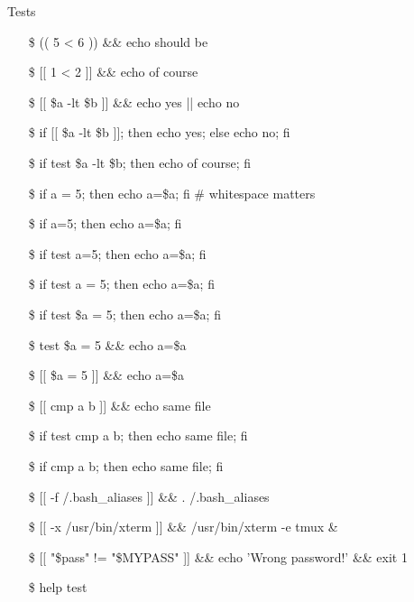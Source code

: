 \begin{frame}[allowframebreaks]{Tests}\small\ttfamily
  \begin{itemize}
  \item[\$] (( 5 < 6 )) \&\& echo should be
  \item[\$] [[ 1 < 2 ]] \&\& echo of course
  \item[\$] [[ \$a -lt \$b ]] \&\& echo yes || echo no
  \item[\$] if [[ \$a -lt \$b ]]; then echo yes; else echo no; fi
  \item[\$] if test \$a -lt \$b; then echo of course; fi
  \item[\$] if a = 5; then echo a=\$a; fi \# whitespace matters \wrong
  \item[\$] if a=5; then echo a=\$a; fi \Bad
  \item[\$] if test a=5; then echo a=\$a; fi \Bad
  \item[\$] if test a = 5; then echo a=\$a; fi \Bad
  \item[\$] if test \$a = 5; then echo a=\$a; fi \correct
  \item[\$] test \$a = 5 \&\& echo a=\$a \correct
  \item[\$] [[ \$a = 5 ]] \&\& echo a=\$a \correct
  \item[\$] [[ cmp a b ]] \&\& echo same file \wrong
  \item[\$] if test cmp a b; then echo same file; fi \wrong
  \item[\$] if cmp a b; then echo same file; fi \correct
  \item[\$] [[ -f \symbol{`~}/.bash\_aliases ]] \&\& . /.bash\_aliases
  \item[\$] [[ -x /usr/bin/xterm ]] \&\& /usr/bin/xterm -e tmux \&
  \item[\$] [[ "\$pass" != "\$MYPASS" ]] \&\& echo 'Wrong password!' \&\& exit 1
  \item[\$] help test
  \end{itemize}
  \begin{block}{}
    \begin{center}
    \end{center}
  \end{block}
\end{frame}

